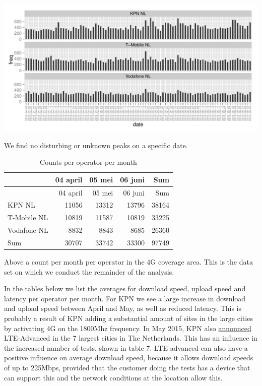 \documentclass[]{article}
\begin{document}
\begin{center}\includegraphics{speedtest-analysis_files/figure-latex/timestamps-1} \end{center}

We find no disturbing or unknown peaks on a specific date.

\begin{longtable}[c]{@{}lrrrr@{}}
\caption{Counts per operator per month}\tabularnewline
\toprule
& 04 april & 05 mei & 06 juni & Sum\tabularnewline
\midrule
\endfirsthead
\toprule
& 04 april & 05 mei & 06 juni & Sum\tabularnewline
\midrule
\endhead
KPN NL & 11056 & 13312 & 13796 & 38164\tabularnewline
T-Mobile NL & 10819 & 11587 & 10819 & 33225\tabularnewline
Vodafone NL & 8832 & 8843 & 8685 & 26360\tabularnewline
Sum & 30707 & 33742 & 33300 & 97749\tabularnewline
\bottomrule
\end{longtable}

Above a count per month per operator in the 4G coverage area. This is
the data set on which we conduct the remainder of the analysis.

In the tables below we list the averages for download speed, upload
speed and latency per operator per month. For KPN we see a large
increase in download and upload speed between April and May, as well as
reduced latency. This is probably a result of KPN adding a substantial
amount of sites in the large cities by activating 4G on the 1800Mhz
frequency. In May 2015, KPN also
\href{http://tweakers.net/nieuws/103231/kpn-biedt-4g+-aan-in-zeven-nederlandse-steden.html}{announced}
LTE-Advanced in the 7 largest cities in The Netherlands. This has an
influence in the increased number of tests, shown in table 7. LTE
advanced can also have a positive influence on average download speed,
because it allows download speeds of up to 225Mbps, provided that the
customer doing the tests has a device that can support this and the
network conditions at the location allow this.
\end{document}
